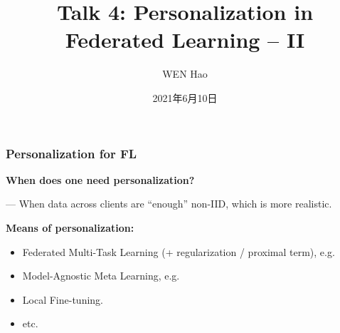 


\title[Personalization]{Talk 4: Personalization in Federated Learning -- II}
\date{2021年6月10日}
\author[]{WEN Hao}




\setlength{\belowdisplayskip}{5pt} \setlength{\belowdisplayshortskip}{5pt}
\setlength{\abovedisplayskip}{5pt} \setlength{\abovedisplayshortskip}{5pt}


\begin{frame}
\titlepage %
\end{frame}

\begin{frame}
\frametitle{Personalization for FL}

{\bfseries When does one need personalization?}

\vspace{0.2em}
\noindent --- When data across clients are ``enough'' non-IID, which is more realistic.

\pause
\vspace{0.8em}

{\bfseries Means of personalization:}
\begin{itemize}
    \item Federated Multi-Task Learning (+ regularization / proximal term), e.g. \cite{smith2017mocha}
    \item Model-Agnostic Meta Learning, e.g. \cite{finn2017maml}
    \item Local Fine-tuning.
    \item etc.
\end{itemize}

\end{frame}

